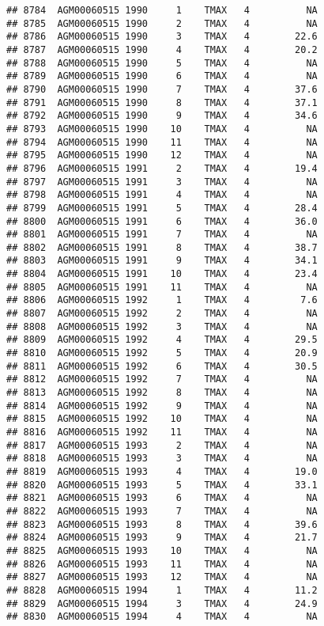 \documentclass{article}\usepackage[]{graphicx}\usepackage[]{color}
\makeatletter
\newenvironment{kframe}{%
 \def\at@end@of@kframe{}%
 \ifinner\ifhmode%
  \def\at@end@of@kframe{\end{minipage}}%
  \begin{minipage}{\columnwidth}%
 \fi\fi%
 \def\FrameCommand##1{\hskip\@totalleftmargin \hskip-\fboxsep
 \colorbox{shadecolor}{##1}\hskip-\fboxsep
     \hskip-\linewidth \hskip-\@totalleftmargin \hskip\columnwidth}%
 \MakeFramed {\advance\hsize-\width
   \@totalleftmargin\z@ \linewidth\hsize
   \@setminipage}}%
 {\par\unskip\endMakeFramed%
 \at@end@of@kframe}
\newenvironment{knitrout}{}{} %
\makeatother
\begin{document}
\begin{knitrout}
\begin{kframe}
\begin{verbatim}
## 8784  AGM00060515 1990     1    TMAX   4          NA
## 8785  AGM00060515 1990     2    TMAX   4          NA
## 8786  AGM00060515 1990     3    TMAX   4        22.6
## 8787  AGM00060515 1990     4    TMAX   4        20.2
## 8788  AGM00060515 1990     5    TMAX   4          NA
## 8789  AGM00060515 1990     6    TMAX   4          NA
## 8790  AGM00060515 1990     7    TMAX   4        37.6
## 8791  AGM00060515 1990     8    TMAX   4        37.1
## 8792  AGM00060515 1990     9    TMAX   4        34.6
## 8793  AGM00060515 1990    10    TMAX   4          NA
## 8794  AGM00060515 1990    11    TMAX   4          NA
## 8795  AGM00060515 1990    12    TMAX   4          NA
## 8796  AGM00060515 1991     2    TMAX   4        19.4
## 8797  AGM00060515 1991     3    TMAX   4          NA
## 8798  AGM00060515 1991     4    TMAX   4          NA
## 8799  AGM00060515 1991     5    TMAX   4        28.4
## 8800  AGM00060515 1991     6    TMAX   4        36.0
## 8801  AGM00060515 1991     7    TMAX   4          NA
## 8802  AGM00060515 1991     8    TMAX   4        38.7
## 8803  AGM00060515 1991     9    TMAX   4        34.1
## 8804  AGM00060515 1991    10    TMAX   4        23.4
## 8805  AGM00060515 1991    11    TMAX   4          NA
## 8806  AGM00060515 1992     1    TMAX   4         7.6
## 8807  AGM00060515 1992     2    TMAX   4          NA
## 8808  AGM00060515 1992     3    TMAX   4          NA
## 8809  AGM00060515 1992     4    TMAX   4        29.5
## 8810  AGM00060515 1992     5    TMAX   4        20.9
## 8811  AGM00060515 1992     6    TMAX   4        30.5
## 8812  AGM00060515 1992     7    TMAX   4          NA
## 8813  AGM00060515 1992     8    TMAX   4          NA
## 8814  AGM00060515 1992     9    TMAX   4          NA
## 8815  AGM00060515 1992    10    TMAX   4          NA
## 8816  AGM00060515 1992    11    TMAX   4          NA
## 8817  AGM00060515 1993     2    TMAX   4          NA
## 8818  AGM00060515 1993     3    TMAX   4          NA
## 8819  AGM00060515 1993     4    TMAX   4        19.0
## 8820  AGM00060515 1993     5    TMAX   4        33.1
## 8821  AGM00060515 1993     6    TMAX   4          NA
## 8822  AGM00060515 1993     7    TMAX   4          NA
## 8823  AGM00060515 1993     8    TMAX   4        39.6
## 8824  AGM00060515 1993     9    TMAX   4        21.7
## 8825  AGM00060515 1993    10    TMAX   4          NA
## 8826  AGM00060515 1993    11    TMAX   4          NA
## 8827  AGM00060515 1993    12    TMAX   4          NA
## 8828  AGM00060515 1994     1    TMAX   4        11.2
## 8829  AGM00060515 1994     3    TMAX   4        24.9
## 8830  AGM00060515 1994     4    TMAX   4          NA

\end{verbatim}
\end{kframe}
\end{knitrout}
\end{document}
